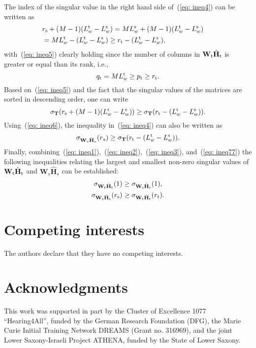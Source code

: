 \documentclass[twocolumn]{bmcart}%
\begin{document}
The index of the singular value in the right hand side of~(\ref{eq: ineq4}) can be written as
\begin{align}
\!\!\!\!\!\!\!\!\!& r_{\rm s}+(M-1)(L^{\rm t}_w-L^{\rm s}_w)  = ML^{\rm s}_w+(M-1)(L^{\rm t}_w-L^{\rm s}_w) \nonumber  \\
\label{eq: ineq5}
\!\!\!\!\!\!\!\!\!& = ML^{\rm t}_w - (L^{\rm t}_w - L^{\rm s}_w) \geq r_{\rm t} - (L^{\rm t}_w - L^{\rm s}_w),
\end{align}
with~(\ref{eq: ineq5}) clearly holding since the number of columns in $\mathbf{W}_{\rm t}\hat{\mathbf{H}}_{\rm t}$ is greater or equal than its rank, i.e.,
\begin{equation}
q_{\rm t} = ML^{\rm t}_w \geq p_{\rm t} \geq r_{\rm t}.
\end{equation}
Based on~(\ref{eq: ineq5}) and the fact that the singular values of the matrices are sorted in descending order, one can write
\begin{equation}
\label{eq: ineq6}
\sigma_{\mathbf{T}}(r_{\rm s}+(M-1)(L^{\rm t}_w-L^{\rm s}_w)) \geq  \sigma_{\mathbf{T}}(r_{\rm t} - (L^{\rm t}_w-L^{\rm s}_w)).
\end{equation}
Using~(\ref{eq: ineq6}), the inequality in~(\ref{eq: ineq4}) can also be written as
\begin{equation}
\label{eq: ineq77}
\sigma_{\mathbf{W}_s\hat{\mathbf{H}}_s}(r_s)  \geq \sigma_{\mathbf{T}}(r_{\rm t}-(L^{\rm t}_w-L^{\rm s}_w)).
\end{equation}
Finally, combining~(\ref{eq: ineq1}),~(\ref{eq: ineq2}),~(\ref{eq: ineq3}), and~(\ref{eq: ineq77}) the following inequalities relating the largest and smallest non-zero singular values of $\mathbf{W}_{\rm t}\hat{\mathbf{H}}_{\rm t}$ and $\mathbf{W}_s\hat{\mathbf{H}}_s$ can be established:
\begin{align}
\sigma_{\mathbf{W}_{\rm t}\hat{\mathbf{H}}_{\rm t}}(1) & \geq \sigma_{\mathbf{W}_{\rm s}\hat{\mathbf{H}}_{\rm s}}(1), \\
\sigma_{\mathbf{W}_{\rm s}\hat{\mathbf{H}}_{\rm s}}(r_{\rm s}) & \geq \sigma_{\mathbf{W}_{\rm t}\hat{\mathbf{H}}_{\rm t}}(r_{\rm t}).
\end{align}

\begin{backmatter}

\section*{Competing interests}
  The authors declare that they have no competing interests.

  \section*{Acknowledgments}
  This work was supported in part by the Cluster of Excellence 1077 ``Hearing4All'', funded by the German Research Foundation (DFG), the Marie Curie Initial Training Network DREAMS (Grant no. 316969), and the joint Lower Saxony-Israeli Project ATHENA, funded by the State of Lower Saxony.
  
 



\end{backmatter}
\end{document}
